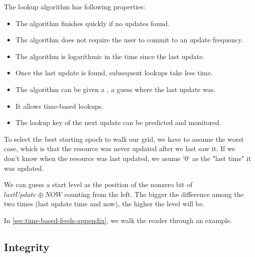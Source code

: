 The lookup algorithm has following properties:

\begin{itemize}
\item The algorithm finishes quickly if no updates found.
\item The algorithm does not require the user to commit to an update frequency.
\item The algorithm is logarithmic in the time since the last update.
\item Once the last update is found, subsequent lookups take less time.
\item The algorithm can be given a , a guess where the last update was.
\item It allows time-based lookups.
\item The lookup key of the next update can be predicted and monitored.
\end{itemize}


To select the best starting epoch to walk our grid, we have to assume the worst case, which is that the resource was never updated after we last saw it. If we don't know when the resource was last updated, we asume `0` as the "last time" it was updated.

We can guess a start level as the position of the nonzero bit of $\mathit{lastUpdate}\oplus \mathit{NOW}$ counting from the left. The bigger the difference among the two times (last update time and now), the higher the level will be.


In \ref{sec:time-based-feeds-appendix}, we walk the reader through an example.

\subsection{Integrity}\label{sec:feed-integrity}

